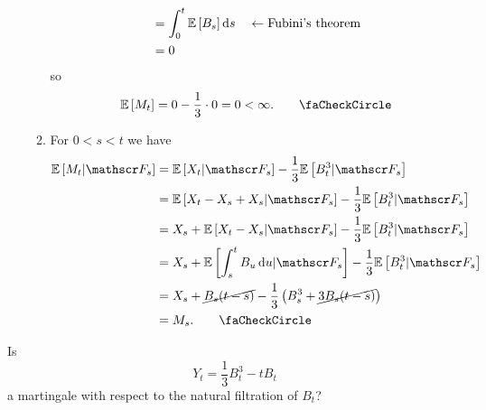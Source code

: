 \documentclass[12pt]{report}
\begin{document}
\begin{enumerate}
\begin{enumerate}
\begin{align*}
			&=\int_{0}^{t}\mathbb{E}\left[B_{s}\right]\mathop{}\!\mathrm{d} s\quad\leftarrow\text{Fubini's theorem}\\
			&=0
		\end{align*}
		so
		\begin{equation*}
			\ev{M_{t}}=0-\frac{1}{3}\cdot 0=0<\infty.\tag*{\faCheckCircle}
		\end{equation*}
		\item For $0<s<t$ we have
		\begin{align*}
			\ev{M_{t}|\F_{s}}&=\ev{X_{t}|\F_{s}}-\frac{1}{3}\ev{B_{t}^{3}|\F_{s}}\\
			&=\ev{X_{t}-X_{s}+X_{s}|\F_{s}}-\frac{1}{3}\ev{B_{t}^{3}|\F_{s}}\\
			&=X_{s}+\ev{X_{t}-X_{s}|\F_{s}}-\frac{1}{3}\ev{B_{t}^{3}|\F_{s}}\\
			&=X_{s}+\ev{\int_{s}^{t}B_{u}\du|\F_{s}}-\frac{1}{3}\ev{B^{3}_{t}|\F_{s}}\\
			&=X_{s}+\cancel{B_{s}(t-s)}-{\frac{1}{3}}\left(B_{s}^{3}+\cancel{3B_{s}(t-s)}\right)\\
			&=M_{s}.\tag*{\faCheckCircle}
		\end{align*}
	\end{enumerate}
\end{enumerate}
\begin{exercise}
	Is 
	\begin{equation*}
		Y_{t}=\frac{1}{3}B_{t}^{3}-tB_{t}
	\end{equation*}
	a martingale with respect to the natural filtration of $B_{t}$?
\end{exercise}
\end{document}

